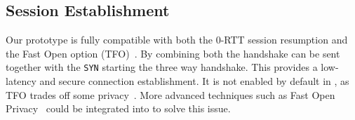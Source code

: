 \subsection{\tcpls Session Establishment}

Our prototype is fully compatible with both the  0-RTT session resumption
and the \tcp Fast Open option (TFO)~\cite{radhakrishnan2011tcp}. By combining both
the \tcpls handshake can be sent together with the \tcp \texttt{SYN} starting 
the three way handshake. This provides a low-latency and secure connection establishment.
It is not enabled by default in \tcpls, as TFO trades off some privacy~\cite{sy2020enhanced}.
More advanced techniques such as \tcp Fast Open Privacy~\cite{sy2020enhanced} 
could be
integrated into \tcpls to solve this issue.





